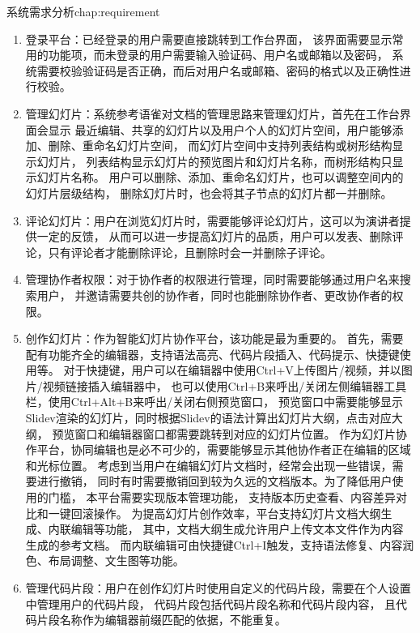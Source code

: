\begin{cuzchapter}{系统需求分析}{chap:requirement}
\begin{enumerate}
    \item 登录平台：已经登录的用户需要直接跳转到工作台界面，
    该界面需要显示常用的功能项，而未登录的用户需要输入验证码、用户名或邮箱以及密码，
    系统需要校验验证码是否正确，而后对用户名或邮箱、密码的格式以及正确性进行校验。
    \item 管理幻灯片：系统参考语雀对文档的管理思路来管理幻灯片，首先在工作台界面会显示
    最近编辑、共享的幻灯片以及用户个人的幻灯片空间，用户能够添加、删除、重命名幻灯片空间，
    而幻灯片空间中支持列表结构或树形结构显示幻灯片，
    列表结构显示幻灯片的预览图片和幻灯片名称，而树形结构只显示幻灯片名称。
    用户可以删除、添加、重命名幻灯片，也可以调整空间内的幻灯片层级结构，
    删除幻灯片时，也会将其子节点的幻灯片都一并删除。
    \item 评论幻灯片：用户在浏览幻灯片时，需要能够评论幻灯片，这可以为演讲者提供一定的反馈，
    从而可以进一步提高幻灯片的品质，用户可以发表、删除评论，只有评论者才能删除评论，且删除时会一并删除子评论。
    \item 管理协作者权限：对于协作者的权限进行管理，同时需要能够通过用户名来搜索用户，
    并邀请需要共创的协作者，同时也能删除协作者、更改协作者的权限。
    \item 创作幻灯片：作为智能幻灯片协作平台，该功能是最为重要的。
    首先，需要配有功能齐全的编辑器，支持语法高亮、代码片段插入、代码提示、快捷键使用等。
    对于快捷键，用户可以在编辑器中使用Ctrl+V上传图片/视频，并以图片/视频链接插入编辑器中，
    也可以使用Ctrl+B来呼出/关闭左侧编辑器工具栏，使用Ctrl+Alt+B来呼出/关闭右侧预览窗口，
    预览窗口中需要能够显示Slidev渲染的幻灯片，同时根据Slidev的语法计算出幻灯片大纲，点击对应大纲，
    预览窗口和编辑器窗口都需要跳转到对应的幻灯片位置。
    作为幻灯片协作平台，协同编辑也是必不可少的，需要能够显示其他协作者正在编辑的区域和光标位置。
    考虑到当用户在编辑幻灯片文档时，经常会出现一些错误，需要进行撤销，
	同时有时需要撤销回到较为久远的文档版本。为了降低用户使用的门槛，
	本平台需要实现版本管理功能，
    支持版本历史查看、内容差异对比和一键回滚操作。
    为提高幻灯片创作效率，平台支持幻灯片文档大纲生成、内联编辑等功能，
    其中，文档大纲生成允许用户上传文本文件作为内容生成的参考文档。
    而内联编辑可由快捷键Ctrl+I触发，支持语法修复、内容润色、布局调整、文生图等功能。
    \item 管理代码片段：用户在创作幻灯片时使用自定义的代码片段，需要在个人设置中管理用户的代码片段，
    代码片段包括代码片段名称和代码片段内容，
    且代码片段名称作为编辑器前缀匹配的依据，不能重复。
\end{enumerate}


\end{cuzchapter}
